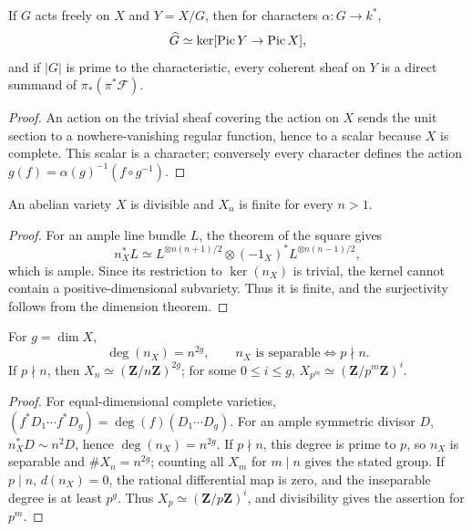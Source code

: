 \begin{proposition}
\label{mumford-source-character-kernel-pic}
If $G$ acts freely on $X$ and $Y=X/G$, then for characters $\alpha:G\to k^*$,
\[
 \widehat G\simeq\ker[\operatorname{Pic} Y\to\operatorname{Pic} X],
\]
and if $|G|$ is prime to the characteristic, every coherent sheaf on $Y$ is
a direct summand of $\pi_*(\pi^*\mathcal F)$.
\end{proposition}
\begin{proof}
An action on the trivial sheaf covering the action on $X$ sends the unit
section to a nowhere-vanishing regular function, hence to a scalar because
$X$ is complete. This scalar is a character; conversely every character
defines the action $g(f)=\alpha(g)^{-1}(f\circ g^{-1})$.
\end{proof}

\begin{corollary}
\label{mumford-cor-divisible-finite-torsion}
An abelian variety $X$ is divisible and $X_n$ is finite for every $n>1$.
\end{corollary}
\begin{proof}
For an ample line bundle $L$, the theorem of the square gives
\[
 n_X^*L\simeq L^{\otimes n(n+1)/2}\otimes(-1_X)^*L^{\otimes n(n-1)/2},
\]
which is ample. Since its restriction to $\ker(n_X)$ is trivial, the kernel
cannot contain a positive-dimensional subvariety. Thus it is finite, and the
surjectivity follows from the dimension theorem.
\end{proof}

\begin{proposition}
\label{mumford-prop-multiplication-degree-separability}
For $g=\dim X$,
\[
 \deg(n_X)=n^{2g},\qquad n_X\text{ is separable}\Longleftrightarrow p\nmid n.
\]
If $p\nmid n$, then $X_n\simeq(\mathbf Z/n\mathbf Z)^{2g}$; for some
$0\le i\le g$, $X_{p^m}\simeq(\mathbf Z/p^m\mathbf Z)^i$.
\end{proposition}
\begin{proof}
For equal-dimensional complete varieties,
$(f^*D_1\cdots f^*D_g)=\deg(f)(D_1\cdots D_g)$. For an ample symmetric
divisor $D$, $n_X^*D\sim n^2D$, hence $\deg(n_X)=n^{2g}$. If $p\nmid n$,
this degree is prime to $p$, so $n_X$ is separable and $\#X_n=n^{2g}$;
counting all $X_m$ for $m\mid n$ gives the stated group. If $p\mid n$,
$d(n_X)=0$, the rational differential map is zero, and the inseparable degree
is at least $p^g$. Thus $X_p\simeq(\mathbf Z/p\mathbf Z)^i$, and divisibility
gives the assertion for $p^m$.
\end{proof}

